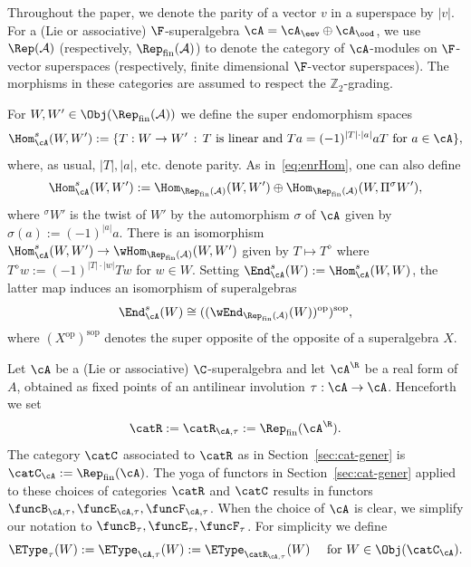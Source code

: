 \documentclass[12pt]{amsart}
\begin{document}
Throughout the paper, we denote the parity of a vector $v$ in a superspace by $|v|$.
For a (Lie or associative) $\F$-superalgebra $\cA=\cA_\eev\oplus\cA_\ood$, we use $\Rep(\mathcal A)$ (respectively, $\Rep_\mathrm{fin}(\mathcal A)$) to denote the category of $\cA$-modules on $\F$-vector superspaces (respectively, finite dimensional $\F$-vector superspaces). The morphisms in these categories are assumed to respect the $\mathbb Z_2$-grading.   


\begin{rmk}
\label{rmk-superhoms}
For $W,W'\in\Obj(\Rep_\mathrm{fin}(\mathcal A))$ we define the super endomorphism spaces \[
\Hom_\cA^s(W,W'):=\{T:W\to W'\,:\,T\text{ is linear and }Ta=(-1)^{|T|\cdot |a|}aT\text{ for }a\in\cA\},
\]
where, as usual, $|T|,|a|$, etc. denote parity. 
As in~\eqref{eq:enrHom}, 
one can also define 
\[
\Hom_\cA^s(W,W'):=\Hom_{\Rep_\mathrm{fin}(\mathcal A)}(W,W')\oplus \Hom_{\Rep_\mathrm{fin}(\mathcal A)}(W,\Pi{^\sigma W'}),
\] where $^\sigma W'$ is the twist of $W'$ by the automorphism $\sigma$ of $\cA$ given by $\sigma(a):=(-1)^{|a|}a$. There is an isomorphism $\Hom_\cA^s(W,W')\to \wHom_{{\Rep_\mathrm{fin}(\mathcal A)}}(W,W')$ given by $T\mapsto T^\diamond$ where 
$T^\diamond w:=(-1)^{|T|\cdot |w|} Tw$ for $w\in W$. 
Setting $\End_\cA^s(W):=\Hom_\cA^s(W,W)$, the latter map induces an isomorphism of superalgebras
\begin{equation}
\label{eq:soops}
\End_\cA^s(W)\cong ((\wEnd_{\Rep_\mathrm{fin}(\mathcal A)}(W))^\mathrm{op})^\mathrm{sop},
\end{equation} 
where $(X^\mathrm{op})^\mathrm{sop}$ denotes the  super opposite of the opposite of a superalgebra $X$.  
\end{rmk}


Let
$\cA$ be a (Lie or associative) $\C$-superalgebra and let $\cA^\R$ be a real form of $A$, obtained as fixed points of an antilinear involution $\tau:\cA\to \cA$. 
Henceforth we set \[
\catR:=\catR_{\cA,\tau}:=\Rep_\mathrm{fin}(\cA^\R).
\]  
The category $\catC$ associated to $\catR$ as in Section~\ref{sec:cat-gener} is $\catC_\cA:=\Rep_\mathrm{fin}(\cA)$. 
The yoga of functors 
in Section~\ref{sec:cat-gener} applied to these choices of categories $\catR$ and $\catC$ results in functors
$\funcB_{\cA,\tau},\funcE_{\cA,\tau},\funcF_{\cA,\tau}$. When the choice of $\cA$ is clear, we simplify our notation to 
$\funcB_{\tau},\funcE_{\tau},\funcF_{\tau}$. For simplicity we define
\begin{equation}
\label{eq:EtypetauA}
\EType_{\tau}(W):=
\EType_{\cA,\tau}(W)
:=\EType_{\catR_{\cA,\tau}}(W)\quad\text{ for }W\in\Obj(\catC_\cA). 
\end{equation}
\end{document}
